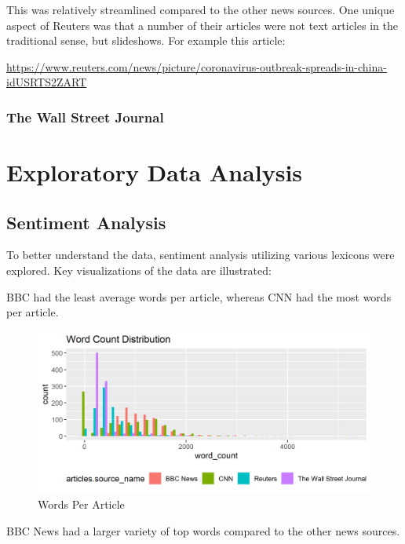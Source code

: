 \documentclass[
]{article}
\begin{document}
This was relatively streamlined compared to the other news sources. One
unique aspect of Reuters was that a number of their articles were not
text articles in the traditional sense, but slideshows. For example this
article:

\url{https://www.reuters.com/news/picture/coronavirus-outbreak-spreads-in-china-idUSRTS2ZART}

\hypertarget{the-wall-street-journal}{%
\subsubsection{The Wall Street Journal}\label{the-wall-street-journal}}

\hypertarget{exploratory-data-analysis}{%
\section{Exploratory Data Analysis}\label{exploratory-data-analysis}}

\hypertarget{sentiment-analysis}{%
\subsection{Sentiment Analysis}\label{sentiment-analysis}}

To better understand the data, sentiment analysis utilizing various
lexicons were explored. Key visualizations of the data are illustrated:

BBC had the least average words per article, whereas CNN had the most
words per article.

\begin{figure}
\centering
\includegraphics{../figures/words_per_article.png}
\caption{Words Per Article}
\end{figure}

BBC News had a larger variety of top words compared to the other news
sources.
\end{document}

